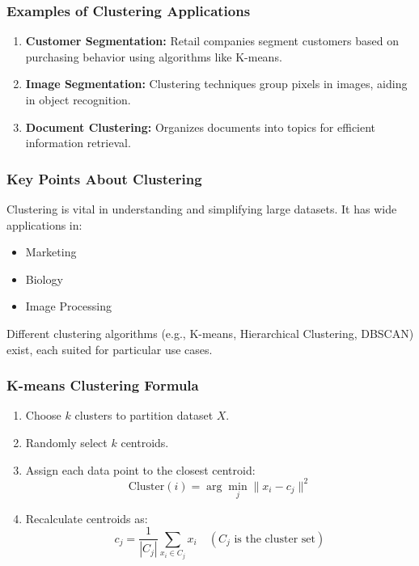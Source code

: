 \documentclass[aspectratio=169]{beamer}
\begin{document}
\begin{frame}[fragile]
    \frametitle{Examples of Clustering Applications}
    \begin{enumerate}
        \item \textbf{Customer Segmentation:} Retail companies segment customers based on purchasing behavior using algorithms like K-means.
        \item \textbf{Image Segmentation:} Clustering techniques group pixels in images, aiding in object recognition.
        \item \textbf{Document Clustering:} Organizes documents into topics for efficient information retrieval.
    \end{enumerate}
\end{frame}

\begin{frame}[fragile]
    \frametitle{Key Points About Clustering}
    Clustering is vital in understanding and simplifying large datasets. It has wide applications in:
    
    \begin{itemize}
        \item Marketing
        \item Biology
        \item Image Processing
    \end{itemize}
    
    Different clustering algorithms (e.g., K-means, Hierarchical Clustering, DBSCAN) exist, each suited for particular use cases.
\end{frame}

\begin{frame}[fragile]
    \frametitle{K-means Clustering Formula}
    \begin{enumerate}
        \item Choose \( k \) clusters to partition dataset \( X \).
        \item Randomly select \( k \) centroids.
        \item Assign each data point to the closest centroid:
        \begin{equation}
        \text{Cluster}(i) = \arg\min_{j} \|x_i - c_j\|^2
        \end{equation}
        
        \item Recalculate centroids as:
        \begin{equation}
        c_j = \frac{1}{|C_j|} \sum_{x_i \in C_j} x_i \quad (C_j \text{ is the cluster set})
        \end{equation}
    \end{enumerate}
\end{frame}
\end{document}
